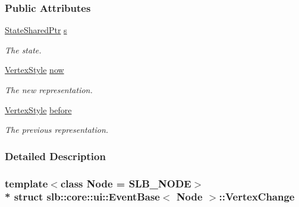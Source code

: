\subsubsection*{Public Attributes}
\begin{DoxyCompactItemize}
\item 
\hyperlink{structslb_1_1core_1_1ui_1_1EventBase_a50419d00607aad434bb97138eabe2c94}{State\+Shared\+Ptr} \hyperlink{structslb_1_1core_1_1ui_1_1EventBase_1_1VertexChange_aae6da42b77b57c06f8e55553148f47bd}{s}\hypertarget{structslb_1_1core_1_1ui_1_1EventBase_1_1VertexChange_aae6da42b77b57c06f8e55553148f47bd}{}\label{structslb_1_1core_1_1ui_1_1EventBase_1_1VertexChange_aae6da42b77b57c06f8e55553148f47bd}

\begin{DoxyCompactList}\small\item\em The state. \end{DoxyCompactList}\item 
\hyperlink{structslb_1_1core_1_1ui_1_1VertexStyle}{Vertex\+Style} \hyperlink{structslb_1_1core_1_1ui_1_1EventBase_1_1VertexChange_a8cc56f868302bf5d9761107d595a7620}{now}\hypertarget{structslb_1_1core_1_1ui_1_1EventBase_1_1VertexChange_a8cc56f868302bf5d9761107d595a7620}{}\label{structslb_1_1core_1_1ui_1_1EventBase_1_1VertexChange_a8cc56f868302bf5d9761107d595a7620}

\begin{DoxyCompactList}\small\item\em The new representation. \end{DoxyCompactList}\item 
\hyperlink{structslb_1_1core_1_1ui_1_1VertexStyle}{Vertex\+Style} \hyperlink{structslb_1_1core_1_1ui_1_1EventBase_1_1VertexChange_a9a792d6455e4509733d7ccd30dd47f44}{before}\hypertarget{structslb_1_1core_1_1ui_1_1EventBase_1_1VertexChange_a9a792d6455e4509733d7ccd30dd47f44}{}\label{structslb_1_1core_1_1ui_1_1EventBase_1_1VertexChange_a9a792d6455e4509733d7ccd30dd47f44}

\begin{DoxyCompactList}\small\item\em The previous representation. \end{DoxyCompactList}\end{DoxyCompactItemize}


\subsubsection{Detailed Description}
\subsubsection*{template$<$class Node = S\+L\+B\+\_\+\+N\+O\+DE$>$\\*
struct slb\+::core\+::ui\+::\+Event\+Base$<$ Node $>$\+::\+Vertex\+Change}

